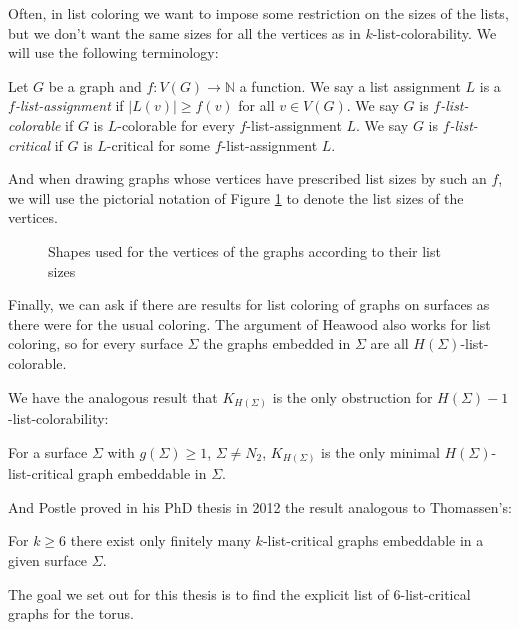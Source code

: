 Often, in list coloring we want to impose some restriction on the sizes of the lists, but 
we don't want the same sizes for all the vertices as in $k$-list-colorability. We will
use the following terminology:

\begin{definition}
	Let $G$ be a graph and $f : V(G) \rightarrow \mathbb{N}$ a function. We say a list 
	assignment $L$ is a \emph{$f$-list-assignment} if $|L(v)| \geq f(v)$ for all $v \in V(G)$. 
	We say $G$ is \emph{$f$-list-colorable} if $G$ is $L$-colorable for every 
	$f$-list-assignment $L$.
	We say $G$ is \emph{$f$-list-critical} if $G$ is $L$-critical for some $f$-list-assignment
	$L$.
\end{definition}

And when drawing graphs whose vertices have prescribed list sizes by such an $f$, we
will use the pictorial notation of Figure \ref{fig:listsizenotation} to denote the list sizes
of the vertices.
\begin{figure}
\label{fig:listsizenotation}
\centering
{}
\caption{Shapes used for the vertices of the graphs according to their list sizes}
\end{figure}

Finally, we can ask if there are results for list coloring of graphs on surfaces as there were
for the usual coloring. The argument of Heawood also works for list coloring, so for every
surface $\Sigma$ the graphs embedded in $\Sigma$ are all $H(\Sigma)$-list-colorable.

We have the analogous result that $K_{H(\Sigma)}$ is the only obstruction for
$H(\Sigma)-1$-list-colorability:

\begin{theorem}
For a surface $\Sigma$ with $g(\Sigma) \geq 1$, $\Sigma \neq N_2$, $K_{H(\Sigma)}$ is the only
minimal $H(\Sigma)$-list-critical graph embeddable in $\Sigma$.
\end{theorem}

And Postle proved in his PhD thesis in 2012 the result analogous to Thomassen's:

\begin{theorem}
For $k \geq 6$ there exist only finitely many $k$-list-critical graphs embeddable in a given
surface $\Sigma$.
\end{theorem}

The goal we set out for this thesis is to find the explicit list of $6$-list-critical graphs 
for the torus. 



